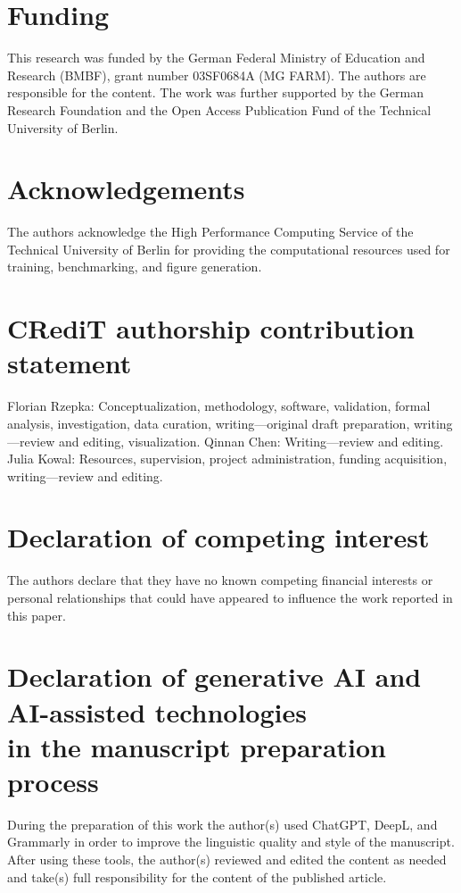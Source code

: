\documentclass[review,nopreprintline]{elsarticle}
\newif\ifanonsubmission
\begin{document}
\clearpage

\section*{Funding}
\ifanonsubmission
Funding details are omitted from the blinded fallback build.
\else
This research was funded by the German Federal Ministry of Education and Research (BMBF), grant number 03SF0684A (MG FARM). The authors are responsible for the content. The work was further supported by the German Research Foundation and the Open Access Publication Fund of the Technical University of Berlin.
\fi

\section*{Acknowledgements}
\ifanonsubmission
Acknowledgements are omitted from the blinded fallback build.
\else
The authors acknowledge the High Performance Computing Service of the Technical University of Berlin for providing the computational resources used for training, benchmarking, and figure generation.
\fi

\section*{CRediT authorship contribution statement}
\ifanonsubmission
The author contribution statement is provided in the non-blinded submission materials.
\else
Florian Rzepka: Conceptualization, methodology, software, validation, formal analysis, investigation, data curation, writing---original draft preparation, writing---review and editing, visualization. Qinnan Chen: Writing---review and editing. Julia Kowal: Resources, supervision, project administration, funding acquisition, writing---review and editing.
\fi

\section*{Declaration of competing interest}
The authors declare that they have no known competing financial interests or personal relationships that could have appeared to influence the work reported in this paper.

\section*{Declaration of generative AI and AI-assisted technologies\\in the manuscript preparation process}
During the preparation of this work the author(s) used ChatGPT, DeepL, and Grammarly in order to improve the linguistic quality and style of the manuscript. After using these tools, the author(s) reviewed and edited the content as needed and take(s) full responsibility for the content of the published article.
\end{document}

